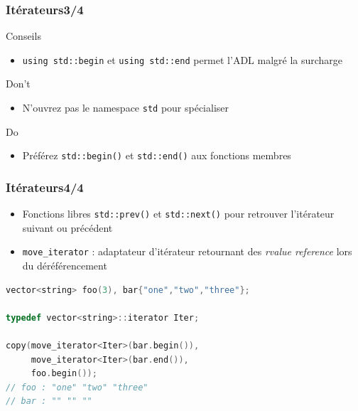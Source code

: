 \documentclass[C++.tex]{subfiles}
\begin{document}
\begin{frame}[fragile]
	\frametitle{Itérateurs\titlehfill{}3/4}
	\begin{block}{Conseils}
		\begin{itemize}
			\item \lstinline|using std::begin| et \lstinline|using std::end| permet l'ADL malgré la surcharge
		\end{itemize}
	\end{block}

	\begin{alertblock}{Don't}
		\begin{itemize}
			\item N'ouvrez pas le namespace \lstinline|std| pour spécialiser
		\end{itemize}
	\end{alertblock}

	\begin{exampleblock}{Do}
		\begin{itemize}
			\item Préférez \lstinline|std::begin()| et \lstinline|std::end()| aux fonctions membres
		\end{itemize}

	\end{exampleblock}
\end{frame}

\begin{frame}[fragile]
	\frametitle{Itérateurs\titlehfill{}4/4}
	\begin{itemize}
		\item Fonctions libres \lstinline|std::prev()| et \lstinline|std::next()| pour retrouver l'itérateur suivant ou précédent
		\item \lstinline|move_iterator| : adaptateur d'itérateur retournant des \textit{rvalue reference} lors du déréférencement
	\end{itemize}

	\begin{lstlisting}[language=C++]
vector<string> foo(3), bar{"one","two","three"};

typedef vector<string>::iterator Iter;

copy(move_iterator<Iter>(bar.begin()),
     move_iterator<Iter>(bar.end()),
     foo.begin());
// foo : "one" "two" "three"
// bar : "" "" ""\end{lstlisting}

\end{frame}
\end{document}
